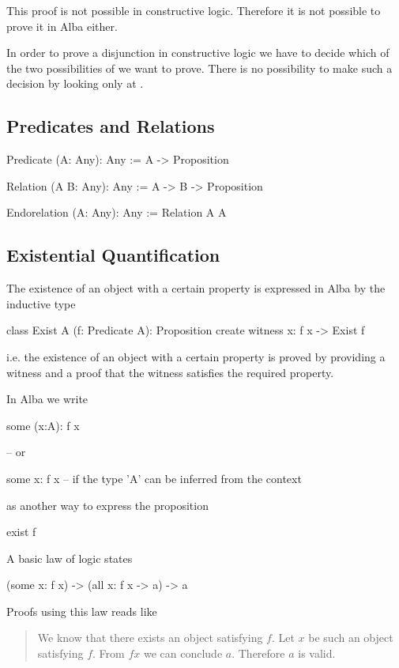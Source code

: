 This proof is not possible in constructive logic. Therefore it is not possible
to prove it in Alba either.

In order to prove a disjunction in constructive logic we have to decide which
of the two possibilities of  we want to prove. There is
no possibility to make such a decision by looking only at .






\subsection{Predicates and Relations}

\begin{alba}
    Predicate (A: Any): Any :=
        A -> Proposition

    Relation (A B: Any): Any :=
        A -> B -> Proposition

    Endorelation (A: Any): Any :=
        Relation A A
\end{alba}






\vskip 5mm
\subsection{Existential Quantification}


The existence of an object with a certain property is expressed in Alba by the
inductive type
%
\begin{alba}
    class
        Exist A (f: Predicate A): Proposition
    create
        witness x: f x -> Exist f
\end{alba}
%
i.e. the existence of an object with a certain property is proved by providing
a witness and a proof that the witness satisfies the required property.

In Alba we write
%
\begin{alba}
  some (x:A): f x

  -- or

  some x: f x   -- if the type 'A' can be inferred from the context
\end{alba}
%
as another way to express the proposition
%
\begin{alba}
  exist f
\end{alba}

A basic law of logic states
%
\begin{alba}
  (some x: f x) -> (all x: f x -> a) -> a
\end{alba}
%
Proofs using this law reads like
\begin{quote}
  We know that there exists an object satisfying $f$. Let $x$ be such an
  object satisfying $f$. From $ f x$ we can conclude $a$. Therefore $a$ is
  valid.
\end{quote}

